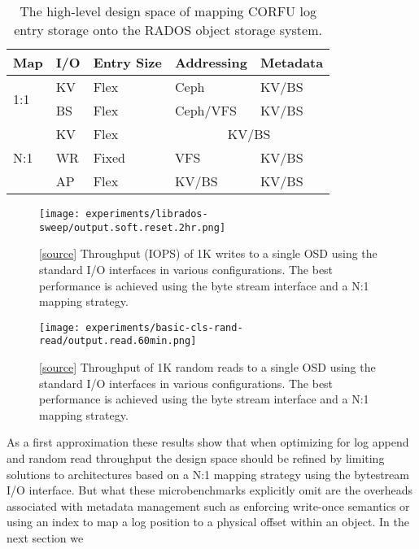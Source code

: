 \documentclass[10pt,twocolumn]{article}
\begin{document}
\begin{table}
\begin{tabular}{ | l | l | l | l | l |}
\hline
Map & I/O & Entry Size & Addressing & Metadata \\ \hline
\multirow{2}{*}{1:1} & KV  & Flex     & Ceph      & KV/BS \\ \cline{2-5}
                     & BS  & Flex     & Ceph/VFS  & KV/BS \\ \hline
\multirow{4}{*}{N:1} & KV  & Flex     & \multicolumn{2}{|c|}{KV/BS} \\ \cline{2-5}
                     & WR  & Fixed    & VFS       & KV/BS \\ \cline{2-5}
                     & AP  & Flex     & KV/BS     & KV/BS \\
\hline
\end{tabular}
\caption{The high-level design space of mapping CORFU log entry storage onto
the RADOS object storage system.}
\label{t:init-ds}
\end{table}

\begin{figure}[h]
  \centering
  \texttt{[image: experiments/librados-sweep/output.soft.reset.2hr.png]}
  \caption{
[\href{https://github.com/noahdesu/zlog-popper/tree/master/experiments/librados-sweep/visualize.ipynb}{source}]
Throughput (IOPS) of 1K writes to a single OSD using the standard I/O
interfaces in various configurations. The best performance is achieved using
the byte stream interface and a N:1 mapping strategy.
}
\end{figure}

\begin{figure}[h]
  \centering
  \texttt{[image: experiments/basic-cls-rand-read/output.read.60min.png]}
  \caption{
[\href{https://github.com/noahdesu/zlog-popper/tree/master/experiments/basic-cls-rand-read/visualize.ipynb}{source}]
Throughput of 1K random reads to a single OSD using the standard I/O
interfaces in various configurations. The best performance is achieved using
the byte stream interface and a N:1 mapping strategy.
}
\end{figure}

As a first approximation these results show that when optimizing for log
append and random read throughput the design space should be refined by
limiting solutions to architectures based on a N:1 mapping strategy using the
bytestream I/O interface. But what these microbenchmarks explicitly omit are
the overheads associated with metadata management such as enforcing write-once
semantics or using an index to map a log position to a physical offset within
an object. In the next section we
\end{document}
